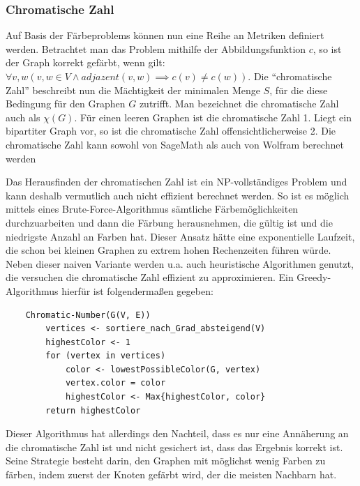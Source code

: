 \documentclass[a4paper,12pt,ngerman,chapterprefix=false,listof=totoc,bibliography=totoc]{scrreprt}
\begin{document}
\subsubsection*{Chromatische Zahl}
{
Auf Basis der Färbeproblems können nun eine Reihe an Metriken definiert werden. Betrachtet man das Problem mithilfe der Abbildungsfunktion \(c\), so ist der Graph korrekt gefärbt, wenn gilt: \(\forall v, w (v,w\in V \land adjazent(v, w)\implies c(v)\neq c(w))\). Die "`chromatische Zahl"' beschreibt nun die Mächtigkeit der minimalen Menge \(S\), für die diese Bedingung für den Graphen \(G\) zutrifft. Man bezeichnet die chromatische Zahl auch als \(\chi (G)\). Für einen leeren Graphen ist die chromatische Zahl 1. Liegt ein bipartiter Graph vor, so ist die chromatische Zahl offensichtlicherweise 2. \cite{diestel_graphentheorie_2000} Die chromatische Zahl kann sowohl von SageMath als auch von Wolfram berechnet werden \cite{sagemath_graph_2020-1,wolfram_wolfram_2020-1}

Das Herausfinden der chromatischen Zahl ist ein NP-vollständiges Problem und kann deshalb vermutlich auch nicht effizient berechnet werden. \cite{weisstein_chromatic_nodate,karp_reducibility_1996} So ist es möglich mittels eines Brute-Force-Algorithmus sämtliche Färbemöglichkeiten durchzuarbeiten und dann die Färbung herausnehmen, die gültig ist und die niedrigste Anzahl an Farben hat. Dieser Ansatz hätte eine exponentielle Laufzeit, die schon bei kleinen Graphen zu extrem hohen Rechenzeiten führen würde. Neben dieser naiven Variante werden u.a. auch heuristische Algorithmen genutzt, die versuchen die chromatische Zahl effizient zu approximieren. Ein Greedy-Algorithmus hierfür ist folgendermaßen gegeben:
\begin{lstlisting}
	Chromatic-Number(G(V, E))
		vertices <- sortiere_nach_Grad_absteigend(V)
		highestColor <- 1
		for (vertex in vertices)
			color <- lowestPossibleColor(G, vertex)
			vertex.color = color
			highestColor <- Max{highestColor, color}
		return highestColor
\end{lstlisting}
Dieser Algorithmus hat allerdings den Nachteil, dass es nur eine Annäherung an die chromatische Zahl ist und nicht gesichert ist, dass das Ergebnis korrekt ist. Seine Strategie besteht darin, den Graphen mit möglichst wenig Farben zu färben, indem zuerst der Knoten gefärbt wird, der die meisten Nachbarn hat. 
}
\end{document}
